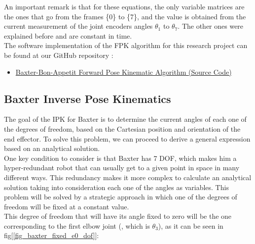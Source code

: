 \documentclass[11pt]{report} %
\begin{document}
An important remark is that for these equations, the only variable matrices are the ones that go from the frames \{0\} to \{7\}, and the value is obtained from the current measurement of the joint encoders angles $\theta_{1}$ to $\theta_{7}$. The other ones were explained before and are constant in time.\\

The software implementation of the FPK algorithm for this research project can be found at our GitHub repository :

\begin{itemize}
    \color{blue}
    \item \href{https://github.com/san99tiago/baxter-bon-appetit/blob/main/python/baxter_bon_appetit/src/baxter_essentials/baxter_fpk.py}{Baxter-Bon-Appetit Forward Pose Kinematic Algorithm (Source Code)}
\end{itemize}


\subsection{Baxter Inverse Pose Kinematics} 
\label{sub_sec_ipk}

The goal of the IPK for Baxter is to determine the current angles of each one of the degrees of freedom, based on the Cartesian position and orientation of the end effector. To solve this problem, we can proceed to derive a general expression based on an analytical solution.\\

One key condition to consider is that Baxter has 7 DOF, which makes him a hyper-redundant robot that can usually get to a given point in space in many different ways. This redundancy makes it more complex to calculate an analytical solution taking into consideration each one of the angles as variables. This problem will be solved by a strategic approach in which one of the degrees of freedom will be fixed at a constant value.\\

This degree of freedom that will have its angle fixed to zero will be the one corresponding to the first elbow joint (, which is $\theta_{3}$), as it can be seen in fig[\ref{fig_baxter_fixed_e0_dof}]:
\end{document}
